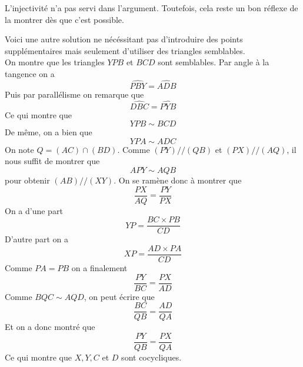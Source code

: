 \begin{rem}
L'injectivité n'a pas servi dans l'argument. Toutefois, cela reste un bon réflexe de la montrer dès que c'est possible.
\end{rem}
\begin{sol}

\begin{center}
\end{center}

Voici une autre solution ne nécéssitant pas d'introduire des points supplémentaires mais seulement d'utiliser des triangles semblables. 
\\
On montre que les triangles $YPB$ et $BCD$ sont semblables. Par angle à la tangence on a 
$$\widehat{PBY}=\widehat{ADB} $$
Puis par parallélisme on remarque que 
$$\widehat{DBC}=\widehat{PYB} $$
Ce qui montre que 
$$YPB\sim BCD $$
De même, on a bien que 
$$YPA\sim ADC $$
On note $Q=(AC)\cap (BD)$.
Comme $(PY)//(QB)$ et $(PX)//(AQ)$, il nous suffit de montrer que 
$$APY\sim AQB $$ pour obtenir $(AB)//(XY)$. On se ramène donc à montrer que 
$$\frac{PX}{AQ}=\frac{PY}{PX} $$
On a d'une part
$$YP=\frac{BC\times PB}{CD} $$
D'autre part on a 
$$XP=\frac{AD\times PA}{CD}$$
Comme $PA=PB$ on a finalement 
$$\frac{PY}{BC}=\frac{PX}{AD} $$
Comme $BQC\sim AQD$, on peut écrire que 
$$\frac{BC}{QB}=\frac{AD}{QA} $$
Et on a donc montré que 
$$\frac{PY}{QB} =\frac{PX}{QA}$$
Ce qui montre que $X,Y,C$ et $D$ sont cocycliques.
\newline


\end{sol}
